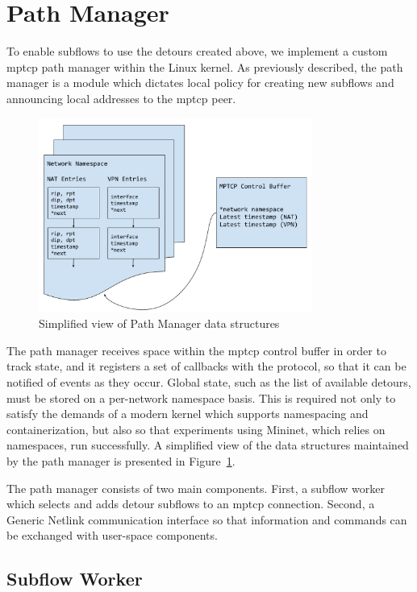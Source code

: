 \documentclass{cwru}
\begin{document}
\section{Path Manager}

To enable subflows to use the detours created above, we implement a custom
\ac{mptcp} path manager within the Linux kernel. As previously described, the
path manager is a module which dictates local policy for creating new subflows
and announcing local addresses to the \ac{mptcp} peer.

\begin{figure}
  \centering
  \includegraphics[width=0.8\textwidth]{figures/KernDataStruct.pdf}
  \caption{Simplified view of Path Manager data structures}
  \label{fig:KernDataStruct}
\end{figure}

The path manager receives space within the \ac{mptcp} control buffer in order to
track state, and it registers a set of callbacks with the protocol, so that it
can be notified of events as they occur. Global state, such as the list of
available detours, must be stored on a per-network namespace basis. This is
required not only to satisfy the demands of a modern kernel which supports
namespacing and containerization, but also so that experiments using Mininet,
which relies on namespaces, run successfully. A simplified view of the data
structures maintained by the path manager is presented in
Figure~\ref{fig:KernDataStruct}.

The path manager consists of two main components. First, a subflow worker which
selects and adds detour subflows to an \ac{mptcp} connection. Second, a Generic
Netlink communication interface so that information and commands can be
exchanged with user-space components.

\subsection{Subflow Worker}
\end{document}
